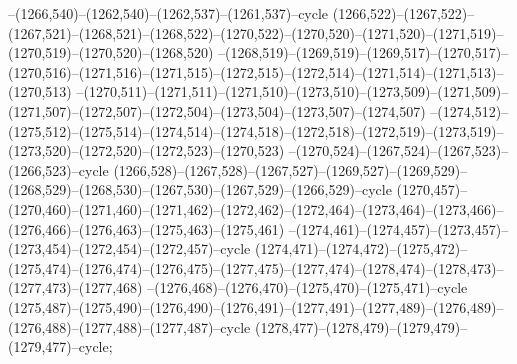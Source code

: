 --(1266,540)--(1262,540)--(1262,537)--(1261,537)--cycle
(1266,522)--(1267,522)--(1267,521)--(1268,521)--(1268,522)--(1270,522)--(1270,520)--(1271,520)--(1271,519)--(1270,519)--(1270,520)--(1268,520)
--(1268,519)--(1269,519)--(1269,517)--(1270,517)--(1270,516)--(1271,516)--(1271,515)--(1272,515)--(1272,514)--(1271,514)--(1271,513)--(1270,513)
--(1270,511)--(1271,511)--(1271,510)--(1273,510)--(1273,509)--(1271,509)--(1271,507)--(1272,507)--(1272,504)--(1273,504)--(1273,507)--(1274,507)
--(1274,512)--(1275,512)--(1275,514)--(1274,514)--(1274,518)--(1272,518)--(1272,519)--(1273,519)--(1273,520)--(1272,520)--(1272,523)--(1270,523)
--(1270,524)--(1267,524)--(1267,523)--(1266,523)--cycle
(1266,528)--(1267,528)--(1267,527)--(1269,527)--(1269,529)--(1268,529)--(1268,530)--(1267,530)--(1267,529)--(1266,529)--cycle
(1270,457)--(1270,460)--(1271,460)--(1271,462)--(1272,462)--(1272,464)--(1273,464)--(1273,466)--(1276,466)--(1276,463)--(1275,463)--(1275,461)
--(1274,461)--(1274,457)--(1273,457)--(1273,454)--(1272,454)--(1272,457)--cycle
(1274,471)--(1274,472)--(1275,472)--(1275,474)--(1276,474)--(1276,475)--(1277,475)--(1277,474)--(1278,474)--(1278,473)--(1277,473)--(1277,468)
--(1276,468)--(1276,470)--(1275,470)--(1275,471)--cycle
(1275,487)--(1275,490)--(1276,490)--(1276,491)--(1277,491)--(1277,489)--(1276,489)--(1276,488)--(1277,488)--(1277,487)--cycle
(1278,477)--(1278,479)--(1279,479)--(1279,477)--cycle;
